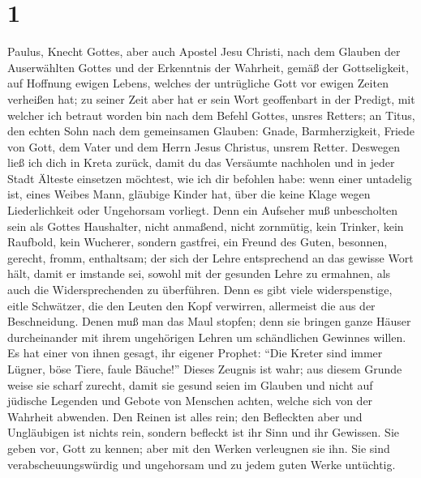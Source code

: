 \hypertarget{section}{%
\section{1}\label{section}}

 Paulus, Knecht Gottes, aber auch Apostel Jesu Christi,
nach dem Glauben der Auserwählten Gottes und der Erkenntnis der
Wahrheit, gemäß der Gottseligkeit,  auf Hoffnung ewigen
Lebens, welches der untrügliche Gott vor ewigen Zeiten verheißen hat;
 zu seiner Zeit aber hat er sein Wort geoffenbart in der
Predigt, mit welcher ich betraut worden bin nach dem Befehl Gottes,
unsres Retters;  an Titus, den echten Sohn nach dem
gemeinsamen Glauben: Gnade, Barmherzigkeit, Friede von Gott, dem Vater
und dem Herrn Jesus Christus, unsrem Retter.  Deswegen
ließ ich dich in Kreta zurück, damit du das Versäumte nachholen und in
jeder Stadt Älteste einsetzen möchtest, wie ich dir befohlen habe:
 wenn einer untadelig ist, eines Weibes Mann, gläubige
Kinder hat, über die keine Klage wegen Liederlichkeit oder Ungehorsam
vorliegt.  Denn ein Aufseher muß unbescholten sein als
Gottes Haushalter, nicht anmaßend, nicht zornmütig, kein Trinker, kein
Raufbold, kein Wucherer,  sondern gastfrei, ein Freund des
Guten, besonnen, gerecht, fromm, enthaltsam;  der sich der
Lehre entsprechend an das gewisse Wort hält, damit er imstande sei,
sowohl mit der gesunden Lehre zu ermahnen, als auch die Widersprechenden
zu überführen.  Denn es gibt viele widerspenstige, eitle
Schwätzer, die den Leuten den Kopf verwirren, allermeist die aus der
Beschneidung.  Denen muß man das Maul stopfen; denn sie
bringen ganze Häuser durcheinander mit ihrem ungehörigen Lehren um
schändlichen Gewinnes willen.  Es hat einer von ihnen
gesagt, ihr eigener Prophet: ``Die Kreter sind immer Lügner, böse Tiere,
faule Bäuche!''  Dieses Zeugnis ist wahr; aus diesem
Grunde weise sie scharf zurecht, damit sie gesund seien im Glauben
 und nicht auf jüdische Legenden und Gebote von Menschen
achten, welche sich von der Wahrheit abwenden.  Den
Reinen ist alles rein; den Befleckten aber und Ungläubigen ist nichts
rein, sondern befleckt ist ihr Sinn und ihr Gewissen. 
Sie geben vor, Gott zu kennen; aber mit den Werken verleugnen sie ihn.
Sie sind verabscheuungswürdig und ungehorsam und zu jedem guten Werke
untüchtig.

